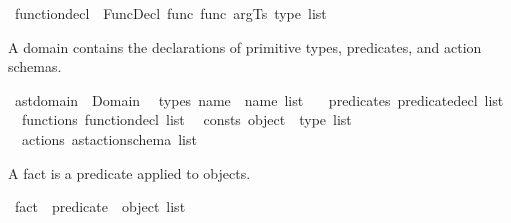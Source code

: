 \begin{isabellebody}
\isanewline
{}\isamarkupfalse%
\ function{\isacharunderscore}{\kern0pt}decl\ {\isacharequal}{\kern0pt}\ FuncDecl\ {\isacharparenleft}{\kern0pt}func{\isacharcolon}{\kern0pt}\ func{\isacharparenright}{\kern0pt}\ {\isacharparenleft}{\kern0pt}argTs{\isacharcolon}{\kern0pt}\ {\isachardoublequoteopen}type\ list{\isachardoublequoteclose}{\isacharparenright}{\kern0pt}%
\begin{isamarkuptext}%
A domain contains the declarations of primitive types, predicates,
  and action schemas.%
\end{isamarkuptext}\isamarkuptrue%
\isamarkupfalse%
\ ast{\isacharunderscore}{\kern0pt}domain\ {\isacharequal}{\kern0pt}\ Domain\isanewline
\ \ {\isacharparenleft}{\kern0pt}types{\isacharcolon}{\kern0pt}\ {\isachardoublequoteopen}{\isacharparenleft}{\kern0pt}name\ {\isasymtimes}\ name{\isacharparenright}{\kern0pt}\ list{\isachardoublequoteclose}{\isacharparenright}{\kern0pt}\ %
\isanewline
\ \ {\isacharparenleft}{\kern0pt}predicates{\isacharcolon}{\kern0pt}\ {\isachardoublequoteopen}predicate{\isacharunderscore}{\kern0pt}decl\ list{\isachardoublequoteclose}{\isacharparenright}{\kern0pt}\isanewline
\ \ {\isacharparenleft}{\kern0pt}{\isachardoublequoteopen}functions{\isachardoublequoteclose}{\isacharcolon}{\kern0pt}\ {\isachardoublequoteopen}function{\isacharunderscore}{\kern0pt}decl\ list{\isachardoublequoteclose}{\isacharparenright}{\kern0pt}\isanewline
\ \ {\isacharparenleft}{\kern0pt}{\isachardoublequoteopen}consts{\isachardoublequoteclose}{\isacharcolon}{\kern0pt}\ {\isachardoublequoteopen}{\isacharparenleft}{\kern0pt}object\ {\isasymtimes}\ type{\isacharparenright}{\kern0pt}\ list{\isachardoublequoteclose}{\isacharparenright}{\kern0pt}\isanewline
\ \ {\isacharparenleft}{\kern0pt}actions{\isacharcolon}{\kern0pt}\ {\isachardoublequoteopen}ast{\isacharunderscore}{\kern0pt}action{\isacharunderscore}{\kern0pt}schema\ list{\isachardoublequoteclose}{\isacharparenright}{\kern0pt}%
\isadelimdocument
%
\endisadelimdocument
%
\isatagdocument
%
\isamarkuptrue%
%
\endisatagdocument
{\isafolddocument}%
%
\isadelimdocument
%
\endisadelimdocument
%
\begin{isamarkuptext}%
A fact is a predicate applied to objects.%
\end{isamarkuptext}\isamarkuptrue%
\isamarkupfalse%
\ fact\ {\isacharequal}{\kern0pt}\ {\isachardoublequoteopen}predicate\ {\isasymtimes}\ object\ list{\isachardoublequoteclose}%

\end{isabellebody}

